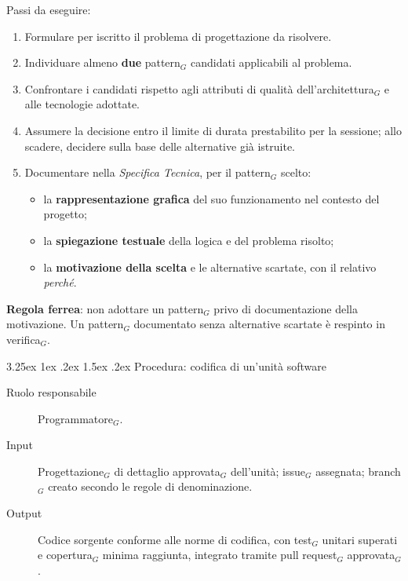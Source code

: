 \documentclass[a4paper, 10pt]{article}
\makeatletter
\renewcommand\paragraph{\@startsection{paragraph}{4}{\z@}%
  {3.25ex \@plus1ex \@minus .2ex}%
  {1.5ex \@plus .2ex}%
  {\normalfont\normalsize\bfseries}}
\makeatother
\begin{document}
\noindent Passi da eseguire:
\begin{enumerate}
    \item Formulare per iscritto il problema di progettazione da risolvere.
    \item Individuare almeno \textbf{due} pattern$_G$ candidati applicabili al problema.
    \item Confrontare i candidati rispetto agli attributi di qualità dell'architettura$_G$ e alle tecnologie adottate.
    \item Assumere la decisione entro il limite di durata prestabilito per la sessione; allo scadere, decidere sulla base delle alternative già istruite.
    \item Documentare nella \textit{Specifica Tecnica}, per il pattern$_G$ scelto:
    \begin{itemize}
        \item la \textbf{rappresentazione grafica} del suo funzionamento nel contesto del progetto;
        \item la \textbf{spiegazione testuale} della logica e del problema risolto;
        \item la \textbf{motivazione della scelta} e le alternative scartate, con il relativo \emph{perché}.
    \end{itemize}
\end{enumerate}

\noindent \textbf{Regola ferrea}: non adottare un pattern$_G$ privo di documentazione della motivazione. Un pattern$_G$ documentato senza alternative scartate è respinto in verifica$_G$.

\paragraph{Procedura: codifica di un'unità software}

\begin{description}
    \item[Ruolo responsabile] Programmatore$_G$.
    \item[Input] Progettazione$_G$ di dettaglio approvata$_G$ dell'unità; issue$_G$ assegnata; branch$_G$ creato secondo le regole di denominazione.
    \item[Output] Codice sorgente conforme alle norme di codifica, con test$_G$ unitari superati e copertura$_G$ minima raggiunta, integrato tramite pull request$_G$ approvata$_G$.
\end{description}
\end{document}
